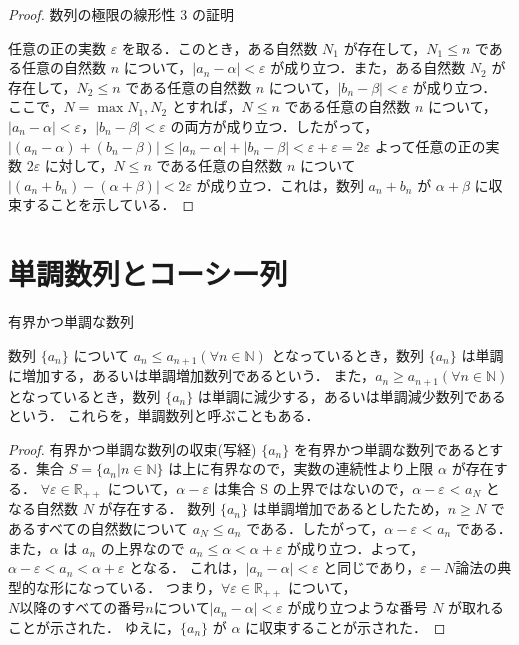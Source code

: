 \documentclass[a4paper]{ltjsarticle}
\begin{document}
\begin{proof}{数列の極限の線形性 3 の証明}{}

任意の正の実数 $\varepsilon$ を取る．このとき，ある自然数 $N_1$ が存在して，$N_1 \leq n$ である任意の自然数 $n$ について，$|a_n - \alpha| < \varepsilon$ が成り立つ．また，ある自然数 $N_2$ が存在して，$N_2 \leq n$ である任意の自然数 $n$ について，$|b_n - \beta| < \varepsilon$ が成り立つ．
\\
ここで，$N = \max {N_1, N_2}$ とすれば，$N \leq n$ である任意の自然数 $n$ について，$|a_n - \alpha| < \varepsilon，|b_n - \beta| < \varepsilon$ の両方が成り立つ．したがって，$|(a_n - \alpha) + (b_n - \beta)| \leq |a_n - \alpha| + |b_n - \beta| < \varepsilon + \varepsilon = 2\varepsilon$ よって任意の正の実数 $2\varepsilon$ に対して，$N \leq n$ である任意の自然数 $n$ について $|(a_n + b_n) - (\alpha + \beta)| < 2\varepsilon$ が成り立つ．これは，数列 ${a_n + b_n}$ が $\alpha + \beta$ に収束することを示している．

\end{proof}

\section{単調数列とコーシー列}
\begin{tcb}{有界かつ単調な数列}{}

数列 $\{a_n\}$ について $a_n \leq a_{n+1} (\forall n \in \mathbb{N})$ となっているとき，数列 $\{a_n\}$ は単調に増加する，あるいは単調増加数列であるという．
また，$a_n \geq a_{n+1} (\forall n \in \mathbb{N})$ となっているとき，数列 $\{a_n\}$ は単調に減少する，あるいは単調減少数列であるという．
これらを，単調数列と呼ぶこともある．

\end{tcb}

\begin{proof}{有界かつ単調な数列の収束(写経)}{}
$\{a_n\}$ を有界かつ単調な数列であるとする．集合 $S = \{a_n | n \in \mathbb{N}\}$ は上に有界なので，実数の連続性より上限 $\alpha$ が存在する．
$\forall \varepsilon \in \mathbb{R_{++}}$ について，$\alpha - \varepsilon$ は集合 S の上界ではないので，$\alpha - \varepsilon$ < $a_N$ となる自然数 $N$ が存在する．
数列 $\{a_n\}$ は単調増加であるとしたため，$n \geq N$ であるすべての自然数について $a_N \leq a_n$ である．したがって，$\alpha - \varepsilon$ < $a_n$ である．
また，$\alpha$ は $a_n$ の上界なので $a_n \leq \alpha < \alpha + \varepsilon$ が成り立つ．よって，$\alpha - \varepsilon < a_n < \alpha + \varepsilon$ となる．
これは，$|a_n - \alpha| < \varepsilon$ と同じであり，$\varepsilon - N$論法の典型的な形になっている．
つまり，$\forall \varepsilon \in \mathbb{R_{++}}$ について，$N 以降のすべての番号 n について |a_n - \alpha| < \varepsilon$ が成り立つような番号 $N$ が取れることが示された．
ゆえに，$\{a_n\}$ が $\alpha$ に収束することが示された．
\end{proof}
\end{document}
